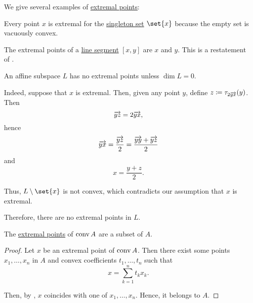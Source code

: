 \begin{example}\label{ex:def:extremal_point}
  We give several examples of \hyperref[def:extremal_point]{extremal points}:
  \begin{thmenum}
     Every point \( x \) is extremal for the \hyperref[rem:singleton_sets]{singleton set} \( \set{ x } \) because the empty set is vacuously convex.

     The extremal points of a \hyperref[def:line_segment]{line segment} \( [x, y] \) are \( x \) and \( y \). This is a restatement of .

     An affine subspace \( L \) has no extremal points unless \( \dim L = 0 \).

    Indeed, suppose that \( x \) is extremal. Then, given any point \( y \), define \( z \coloneqq \tau_{2 \overrightarrow{yx}}(y) \). Then
    \begin{equation*}
      \overrightarrow{yz} = 2 \overrightarrow{yx},
    \end{equation*}
    hence
    \begin{equation*}
      \overrightarrow{yx} = \frac {\overrightarrow{yz}} 2 = \frac {\overrightarrow{yy} + \overrightarrow{yz}} 2
    \end{equation*}
    and
    \begin{equation*}
      x = \frac {y + z} 2.
    \end{equation*}

    Thus, \( L \setminus \set{ x } \) is not convex, which contradicts our assumption that \( x \) is extremal.

    Therefore, there are no extremal points in \( L \).
  \end{thmenum}
\end{example}

\begin{proposition}\label{thm:extremal_points_of_convex_hull}
  The \hyperref[def:extremal_point]{extremal points} of \( \operatorname{conv} A \) are a subset of \( A \).
\end{proposition}
\begin{proof}
  Let \( x \) be an extremal point of \( \operatorname{conv} A \). Then there exist some points \( x_1, \ldots, x_n \) in \( A \) and convex coefficients \( t_1, \ldots, t_n \) such that
  \begin{equation*}
    x = \sum_{k=1}^n t_k x_k.
  \end{equation*}

  Then, by , \( x \) coincides with one of \( x_1, \ldots, x_n \). Hence, it belongs to \( A \).
\end{proof}

